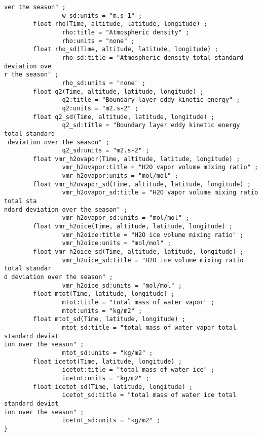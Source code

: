 {\begin{verbatim}
ver the season" ;
                w_sd:units = "m.s-1" ;
        float rho(Time, altitude, latitude, longitude) ;
                rho:title = "Atmospheric density" ;
                rho:units = "none" ;
        float rho_sd(Time, altitude, latitude, longitude) ;
                rho_sd:title = "Atmospheric density total standard deviation ove
r the season" ;
                rho_sd:units = "none" ;
        float q2(Time, altitude, latitude, longitude) ;
                q2:title = "Boundary layer eddy kinetic energy" ;
                q2:units = "m2.s-2" ;
        float q2_sd(Time, altitude, latitude, longitude) ;
                q2_sd:title = "Boundary layer eddy kinetic energy total standard
 deviation over the season" ;
                q2_sd:units = "m2.s-2" ;
        float vmr_h2ovapor(Time, altitude, latitude, longitude) ;
                vmr_h2ovapor:title = "H2O vapor volume mixing ratio" ;
                vmr_h2ovapor:units = "mol/mol" ;
        float vmr_h2ovapor_sd(Time, altitude, latitude, longitude) ;
                vmr_h2ovapor_sd:title = "H2O vapor volume mixing ratio total sta
ndard deviation over the season" ;
                vmr_h2ovapor_sd:units = "mol/mol" ;
        float vmr_h2oice(Time, altitude, latitude, longitude) ;
                vmr_h2oice:title = "H2O ice volume mixing ratio" ;
                vmr_h2oice:units = "mol/mol" ;
        float vmr_h2oice_sd(Time, altitude, latitude, longitude) ;
                vmr_h2oice_sd:title = "H2O ice volume mixing ratio total standar
d deviation over the season" ;
                vmr_h2oice_sd:units = "mol/mol" ;
        float mtot(Time, latitude, longitude) ;
                mtot:title = "total mass of water vapor" ;
                mtot:units = "kg/m2" ;
        float mtot_sd(Time, latitude, longitude) ;
                mtot_sd:title = "total mass of water vapor total standard deviat
ion over the season" ;
                mtot_sd:units = "kg/m2" ;
        float icetot(Time, latitude, longitude) ;
                icetot:title = "total mass of water ice" ;
                icetot:units = "kg/m2" ;
        float icetot_sd(Time, latitude, longitude) ;
                icetot_sd:title = "total mass of water ice total standard deviat
ion over the season" ;
                icetot_sd:units = "kg/m2" ;
}
\end{verbatim}
}
